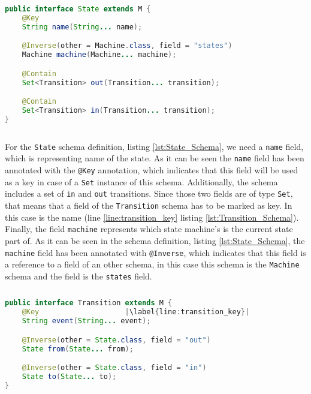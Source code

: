 \begin{sourcecode}[H]
	\begin{lstlisting}[language=Java,escapechar=|]
public interface State extends M {
	@Key
	String name(String... name);

	@Inverse(other = Machine.class, field = "states")
	Machine machine(Machine... machine);

	@Contain
	Set<Transition> out(Transition... transition);

	@Contain
	Set<Transition> in(Transition... transition);
}
	\end{lstlisting}
	\caption{The State Schema}
	\label{lst:State_Schema}
\end{sourcecode}

For the \texttt{State} schema definition, listing \ref{lst:State_Schema}, we need a \texttt{name} field, which is representing name of the state. 
As it can be seen the \texttt{name} field has been annotated with the \texttt{@Key} annotation, which indicates that this field will be used as a key in case of a \texttt{Set} instance of this schema.
Additionally, the schema includes a set of \texttt{in} and \texttt{out} transitions.
Since those two fields are of type \texttt{Set}, that means that a field of the \texttt{Transition} schema has to be marked as key.
In this case is the name (line \ref{line:transition_key} listing \ref{lst:Transition_Schema}).
Finally, the field \texttt{machine} represents which state machine's is the current state part of. 
As it can be seen in the schema definition, listing \ref{lst:State_Schema}, the \texttt{machine} field has been annotated with \texttt{@Inverse}, which indicates that this field is a reference to a field of an other schema, in this case this schema is the \texttt{Machine} schema and the field is the \texttt{states} field.

\begin{sourcecode}[H]
	\begin{lstlisting}[language=Java,escapechar=|]
public interface Transition extends M {
	@Key 					|\label{line:transition_key}| 
	String event(String... event);

	@Inverse(other = State.class, field = "out")
	State from(State... from);

	@Inverse(other = State.class, field = "in")
	State to(State... to);
}
	\end{lstlisting}
	\caption{The Transition Schema}
	\label{lst:Transition_Schema}
\end{sourcecode}

